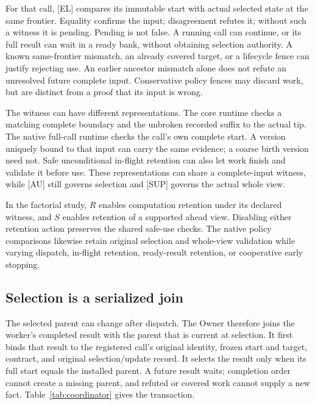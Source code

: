For that call, [EL] compares its immutable start with actual selected
state at the same frontier. Equality confirms the input; disagreement
refutes it; without such a witness it is pending. Pending is not false.
A running call can continue, or its full result can wait in a ready bank,
without obtaining selection authority. A known same-frontier mismatch,
an already covered target, or a lifecycle fence can justify rejecting
use. An earlier ancestor mismatch alone does not refute an unresolved
future complete input. Conservative policy fences may discard work,
but are distinct from a proof that its input is wrong.

The witness can have different representations. The core runtime checks
a matching complete boundary and the unbroken recorded suffix to the
actual tip. The native full-call runtime checks the call's own complete
start. A version uniquely bound to that input can carry the same
evidence; a coarse birth version need not. Safe unconditional in-flight
retention can also let work finish and validate it before use. These
representations can share a complete-input witness, while [AU] still
governs selection and [SUP] governs the actual whole view.

In the factorial study, $R$ enables computation retention under its
declared witness, and $S$ enables retention of a supported ahead view.
Disabling either retention action preserves the shared safe-use checks.
The native policy comparisons likewise retain original selection and
whole-view validation while varying dispatch, in-flight retention,
ready-result retention, or cooperative early stopping.

\subsection{Selection is a serialized join}
The selected parent can change after dispatch. The Owner therefore joins
the worker's completed result with the parent that is current at
selection. It first binds that result to the registered call's original
identity, frozen start and target, contract, and original selection/update
record. It selects the result only when its full start equals the
installed parent. A future result waits; completion order cannot create
a missing parent, and refuted or covered work cannot supply a new fact.
Table~\ref{tab:coordinator} gives the transaction.

